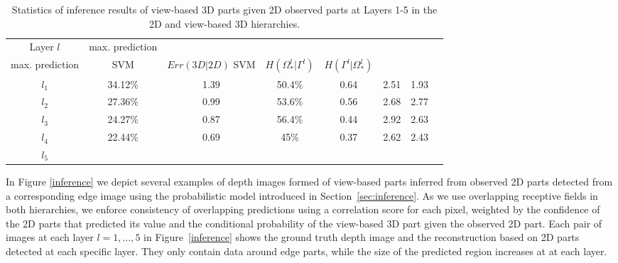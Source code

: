 \documentclass[runningheads]{llncs}
\begin{document}
 \begin{table}
 \begin{center}
  \begin{tabular}{ | c | c | c | c | c | c | c |r |}
      \hline
      Layer $l$  & max. prediction & {\begin{minipage}{0.9in}$\quad Err(3D|2D)$ \\ max. prediction \end{minipage}} & SVM & {\begin{minipage}{0.7in}$Err(3D|2D)$       SVM \end{minipage}} & $H(\Omega_*^l|\Gamma^l)$ & $H(\Gamma^l|\Omega_*^l)$  \\ \hline
    $l_1$ &  34.12\% & 1.39 & 50.4\% & 0.64 & 2.51 & 1.93 \\ \hline
    $l_2$ &  27.36\% & 0.99 & 53.6\% & 0.56 & 2.68 & 2.77 \\ \hline
    $l_3$ &  24.27\% & 0.87 & 56.4\% & 0.44 & 2.92 & 2.63 \\ \hline 
    $l_4$ &  22.44\% & 0.69 & 45\% & 0.37 & 2.62 & 2.43 \\ \hline
    $l_5$ &   &  &  &  &  &  \\ 
    \hline
  \end{tabular}
\end{center}
 \caption{Statistics of inference results of view-based 3D parts given 2D observed parts at Layers 1-5 in the 2D and view-based 3D hierarchies.}
 \label{tab:stats.inference}
\end{table}

In Figure \ref{inference} we depict several examples of depth images formed of view-based parts inferred from observed 2D parts detected from a corresponding edge image using the probabilistic model introduced in Section~\ref{sec:inference}. As we use overlapping receptive fields in both hierarchies, we enforce consistency of overlapping predictions using a correlation score for each pixel, weighted by the confidence of the 2D parts that predicted its value and the conditional probability of the view-based 3D part given the observed 2D part. Each pair of images at each layer $l=1,\ldots,5$ in Figure~\ref{inference} shows the ground truth depth image and the reconstruction based on 2D parts detected at each specific layer.  They only contain data around edge parts, while the size of the predicted region increases at at each layer.
\end{document}

